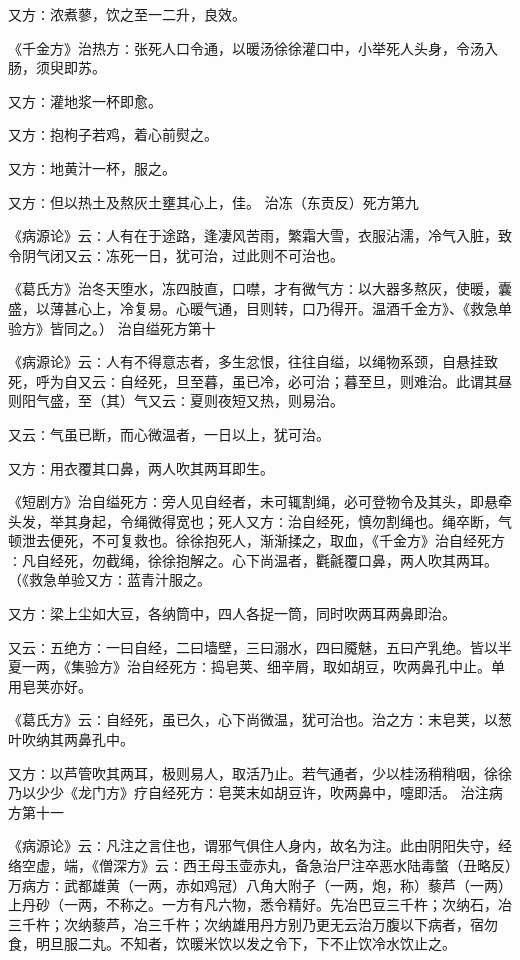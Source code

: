 \documentclass[a4paper,12pt,UTF8,twoside]{ctexbook}
\begin{document}
又方∶浓煮蓼，饮之至一二升，良效。

《千金方》治热方∶张死人口令通，以暖汤徐徐灌口中，小举死人头身，令汤入肠，须臾即苏。

又方∶灌地浆一杯即愈。

又方∶抱枸子若鸡，着心前熨之。

又方∶地黄汁一杯，服之。

又方∶但以热土及熬灰土壅其心上，佳。
治冻（东贡反）死方第九

《病源论》云∶人有在于途路，逢凄风苦雨，繁霜大雪，衣服沾濡，冷气入脏，致令阴气闭又云∶冻死一日，犹可治，过此则不可治也。

《葛氏方》治冬天堕水，冻四肢直，口噤，才有微气方∶以大器多熬灰，使暖，囊盛，以薄甚心上，冷复易。心暖气通，目则转，口乃得开。温酒千金方》、《救急单验方》皆同之。）
治自缢死方第十

《病源论》云∶人有不得意志者，多生忿恨，往往自缢，以绳物系颈，自悬挂致死，呼为自又云∶自经死，旦至暮，虽已冷，必可治；暮至旦，则难治。此谓其昼则阳气盛，至（其）气又云∶夏则夜短又热，则易治。

又云∶气虽已断，而心微温者，一日以上，犹可治。

又方∶用衣覆其口鼻，两人吹其两耳即生。

《短剧方》治自缢死方∶旁人见自经者，未可辄割绳，必可登物令及其头，即悬牵头发，举其身起，令绳微得宽也；死人又方∶治自经死，慎勿割绳也。绳卒断，气顿泄去便死，不可复救也。徐徐抱死人，渐渐揉之，取血，《千金方》治自经死方∶凡自经死，勿截绳，徐徐抱解之。心下尚温者，氍毹覆口鼻，两人吹其两耳。（《救急单验又方∶蓝青汁服之。

又方∶梁上尘如大豆，各纳筒中，四人各捉一筒，同时吹两耳两鼻即治。

又云∶五绝方∶一曰自经，二曰墙壁，三曰溺水，四曰魇魅，五曰产乳绝。皆以半夏一两，《集验方》治自经死方∶捣皂荚、细辛屑，取如胡豆，吹两鼻孔中止。单用皂荚亦好。

《葛氏方》云∶自经死，虽已久，心下尚微温，犹可治也。治之方∶末皂荚，以葱叶吹纳其两鼻孔中。

又方∶以芦管吹其两耳，极则易人，取活乃止。若气通者，少以桂汤稍稍咽，徐徐乃以少少《龙门方》疗自经死方∶皂荚末如胡豆许，吹两鼻中，嚏即活。
治注病方第十一

《病源论》云∶凡注之言住也，谓邪气俱住人身内，故名为注。此由阴阳失守，经络空虚，端，《僧深方》云∶西王母玉壶赤丸，备急治尸注卒恶水陆毒螫（丑略反）万病方∶武都雄黄（一两，赤如鸡冠）八角大附子（一两，炮，称）藜芦（一两）上丹砂（一两，不称之。一方有凡六物，悉令精好。先冶巴豆三千杵；次纳石，冶三千杵；次纳藜芦，冶三千杵；次纳雄用丹方别乃更无云治万腹以下病者，宿勿食，明旦服二丸。不知者，饮暖米饮以发之令下，下不止饮冷水饮止之。
\end{document}
